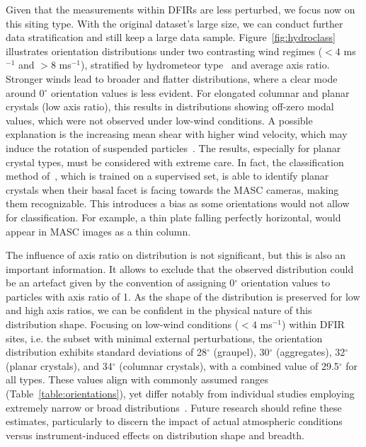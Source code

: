 \documentclass[draft]{agujournal2019}
\begin{document}
Given that the measurements within DFIRs are less perturbed, we focus now on this siting type. With the original dataset's large size, we can conduct further data stratification and still keep a large data sample. Figure~\ref{fig:hydroclass} illustrates orientation distributions under two contrasting wind regimes ($<4$ ms$^{-1}$ and $>8$ ms$^{-1}$), stratified by hydrometeor type~\cite{Praz_AMT_2017} and average axis ratio. Stronger winds lead to broader and flatter distributions, where a clear mode around 0$^\circ$ orientation values is less evident. For elongated columnar and planar crystals (low axis ratio), this results in distributions showing off-zero modal values, which were not observed under low-wind conditions. A possible explanation is the increasing mean shear with higher wind velocity, which may induce the rotation of suspended particles~\cite{Saffman_JFM_1956}. The results, especially for planar crystal types, must be considered with extreme care. In fact, the classification method of~\cite{Praz_AMT_2017}, which is trained on a supervised set, is able to identify planar crystals when their basal facet is facing towards the MASC cameras, making them recognizable.  This introduces a bias as some orientations would not allow for classification. For example, a thin plate falling perfectly horizontal, would appear in MASC images as a thin column. 

The influence of axis ratio on distribution is not significant, but this is also an important information. It allows to exclude that the observed distribution could be an artefact given by the convention of assigning 0$^\circ$ orientation values to particles with axis ratio of 1. As the shape of the distribution is preserved for low and high axis ratios, we can be confident in the physical nature of this distribution shape. 
 Focusing on low-wind conditions ($<4$ ms$^{-1}$) within DFIR sites, i.e. the subset with minimal external perturbations, the orientation distribution exhibits standard deviations of 28$^\circ$ (graupel), 30$^\circ$ (aggregates), 32$^\circ$ (planar crystals), and 34$^\circ$ (columnar crystals), with a combined value of 29.5$^\circ$ for all types. These values align with commonly assumed ranges (Table~\ref{table:orientations}), yet differ notably from individual studies employing extremely narrow or broad distributions~\cite{Matrosov_JAM_2001, Matrosov_JAS_2005, Ryzhkov_JAMC_2011, Bukovic_JAMC_2018}. Future research should refine these estimates, particularly to discern the impact of actual atmospheric conditions versus instrument-induced effects on distribution shape and breadth.
\end{document}
